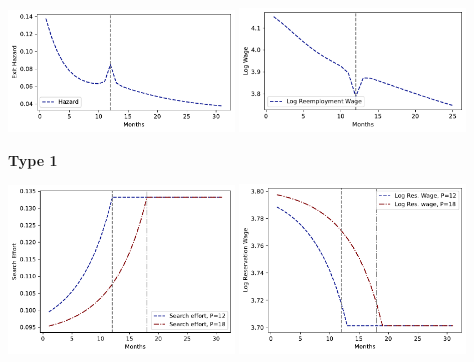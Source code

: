 \documentclass[letter, 10pt]{article}
\begin{document}
 

 
\includegraphics[clip=true,trim=0cm 0cm 0cm 0cm,width = 0.45\textwidth]{figures_Est1_compiled/fig_haz_agg.pdf}
\includegraphics[clip=true,trim=0cm 0cm 0cm 0cm,width = 0.45\textwidth]{figures_Est1_compiled/fig_wage_agg.pdf} 

\pagebreak 
 \textbf{Type 1} 
 
\includegraphics[clip=true,trim=0cm 0cm 0cm 0cm,width = 0.45\textwidth]{figures_Est1_compiled/fig_type1_s.pdf} 
\includegraphics[clip=true,trim=0cm 0cm 0cm 0cm,width = 0.45\textwidth]{figures_Est1_compiled/fig_type1_phi.pdf} 
\end{document}

